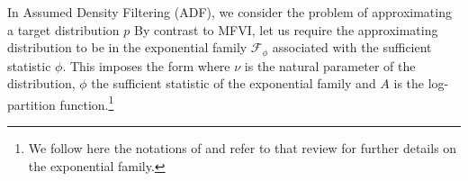 \vspace*{2cm}
In Assumed Density Filtering (ADF), we consider the problem of approximating a target distribution $p$
By contrast to MFVI, let us require the approximating distribution to be in the exponential family $\mathcal F_\phi$ associated with the sufficient statistic $\phi$. This imposes the form
where $\nu$ is the natural parameter of the distribution, $\phi$ the sufficient statistic of the exponential family and $A$ is the log-partition function.\footnote{We follow here the notations of \citet{wainwright08} and refer to that review for further details on the exponential family.} \\
%
%
%
